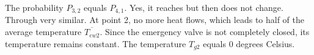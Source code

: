 The probability \( P_{3,2} \) equals \( P_{4,1} \). Yes, it reaches but then does not change. Through very similar. At point 2, no more heat flows, which leads to half of the average temperature \( \overline{T_{ew2}} \). Since the emergency valve is not completely closed, its temperature remains constant. The temperature \( T_{g2} \) equals 0 degrees Celsius.